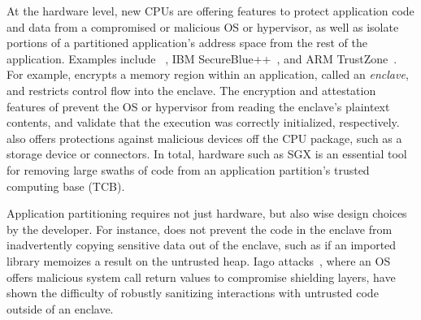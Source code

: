 At the hardware level, 
new CPUs are offering features to protect application code and data
from a compromised or malicious OS or hypervisor,
as well as isolate portions of a partitioned 
application's address space from the rest of the application.
Examples include \intel{} \sgx{}~\cite{sgx-manual}, 
IBM SecureBlue++~\cite{secureblue++}, and ARM TrustZone~\cite{trustzone}.
For example, \sgx{}
encrypts a memory region within an application, called an {\em enclave},
and restricts control flow into the enclave.
The encryption and attestation features of \sgx{}
prevent the OS or hypervisor from reading the enclave's plaintext contents,
and validate that the execution was correctly initialized, respectively.
\sgx{} also offers  protections against malicious devices off the CPU package,
such as a storage device or connectors.
In total, hardware such as SGX is an essential tool for removing
large swaths of code from an application partition's trusted computing base (TCB).

Application partitioning requires not just hardware, but also wise design choices
by the developer.
For instance, 
\sgx{} does not prevent the code in the enclave from
inadvertently copying sensitive data out of the enclave,
 such as if an imported library memoizes a result on the untrusted heap.
Iago attacks~\cite{iago}, where an OS offers malicious system call return values to compromise shielding layers,
have shown the difficulty of robustly sanitizing interactions with
untrusted code outside of an enclave.


